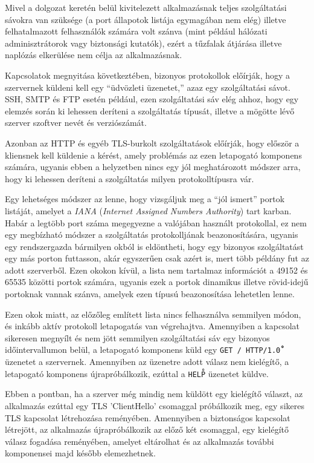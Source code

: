 	Mivel a dolgozat keretén belül kivitelezett alkalmazásnak teljes szolgáltatási sávokra van szüksége (a port állapotok listája egymagában nem elég) illetve felhatalmazott felhasználók számára volt szánva (mint például hálózati adminisztrátorok vagy biztonsági kutatók), ezért a tűzfalak átjárása illetve naplózás elkerülése nem célja az alkalmazásnak.


	Kapcsolatok megnyitása következtében, bizonyos protokollok előírják, hogy a szervernek küldeni kell egy ``üdvözleti üzenetet,'' azaz egy szolgáltatási sávot. SSH, SMTP és FTP esetén például, ezen szolgáltatási sáv elég ahhoz, hogy egy elemzés során ki lehessen deríteni a szolgáltatás típusát, illetve a mögötte lévő szerver szoftver nevét és verziószámát.
	
	Azonban az HTTP és egyéb TLS-burkolt szolgáltatások előírják, hogy először a kliensnek kell küldenie a kérést, amely problémás az ezen letapogató komponens számára, ugyanis ebben a helyzetben nincs egy jól meghatározott módszer arra, hogy ki lehessen deríteni a szolgáltatás milyen protokolltípusra vár.
	
	Egy lehetséges módszer az lenne, hogy vizsgáljuk meg a ``jól ismert'' portok\cite{iana16} listáját, amelyet a \textit{IANA} (\textit{Internet Assigned Numbers Authority}) tart karban. Habár a legtöbb port száma megegyezne a valójában használt protokollal, ez nem egy megbízható módszer a szolgáltatás protokolljának beazonosítására, ugyanis egy rendszergazda bármilyen okból is eldöntheti, hogy egy bizonyos szolgáltatást egy más porton futtasson, akár egyszerűen csak azért is, mert több példány fut az adott szerverből. Ezen okokon kívül, a lista nem tartalmaz információt a 49152 és 65535 közötti portok számára, ugyanis ezek a portok dinamikus illetve rövid-idejű portoknak vannak szánva, amelyek ezen típusú beazonosítása lehetetlen lenne.
	
	Ezen okok miatt, az előzőleg említett lista nincs felhasználva semmilyen módon, és inkább aktív protokoll letapogatás van végrehajtva. Amennyiben a kapcsolat sikeresen megnyílt és nem jött semmilyen szolgáltatási sáv egy bizonyos időintervallumon belül, a letapogató komponens küld egy \texttt{GET / HTTP/1.0}\texttt{\r\n\r\n} üzenetet a szervernek. Amennyiben az üzenetre adott válasz nem kielégítő, a letapogató komponens újrapróbálkozik, ezúttal a \texttt{HELP\r\n} üzenetet küldve.
	
	Ebben a pontban, ha a szerver még mindig nem küldött egy kielégítő választ, az alkalmazás ezúttal egy TLS 'ClientHello' csomaggal próbálkozik meg, egy sikeres TLS kapcsolat létrehozása reményében. Amennyiben a biztonságos kapcsolat létrejött, az alkalmazás újrapróbálkozik az előző két csomaggal, egy kielégítő válasz fogadása reményében, amelyet eltárolhat és az alkalmazás további komponensei majd később elemezhetnek.

